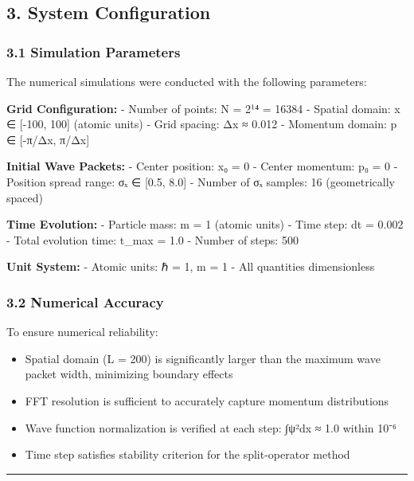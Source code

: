\documentclass[
]{article}
\providecommand{\tightlist}{%
  \setlength{\itemsep}{0pt}\setlength{\parskip}{0pt}}
\begin{document}
\subsection{3. System Configuration}\label{system-configuration}

\subsubsection{3.1 Simulation Parameters}\label{simulation-parameters}

The numerical simulations were conducted with the following parameters:

\textbf{Grid Configuration:} - Number of points: N = 2¹⁴ = 16384 -
Spatial domain: x ∈ {[}-100, 100{]} (atomic units) - Grid spacing: Δx ≈
0.012 - Momentum domain: p ∈ {[}-π/Δx, π/Δx{]}

\textbf{Initial Wave Packets:} - Center position: x₀ = 0 - Center
momentum: p₀ = 0 - Position spread range: σₓ ∈ {[}0.5, 8.0{]} - Number
of σₓ samples: 16 (geometrically spaced)

\textbf{Time Evolution:} - Particle mass: m = 1 (atomic units) - Time
step: dt = 0.002 - Total evolution time: t\_max = 1.0 - Number of steps:
500

\textbf{Unit System:} - Atomic units: ℏ = 1, m = 1 - All quantities
dimensionless

\subsubsection{3.2 Numerical Accuracy}\label{numerical-accuracy}

To ensure numerical reliability:

\begin{itemize}
\tightlist
\item
  Spatial domain (L = 200) is significantly larger than the maximum wave
  packet width, minimizing boundary effects
\item
  FFT resolution is sufficient to accurately capture momentum
  distributions
\item
  Wave function normalization is verified at each step:
  ∫\textbar ψ\textbar²dx ≈ 1.0 within 10⁻⁶
\item
  Time step satisfies stability criterion for the split-operator method
\end{itemize}

\begin{center}\rule{0.5\linewidth}{0.5pt}\end{center}
\end{document}
